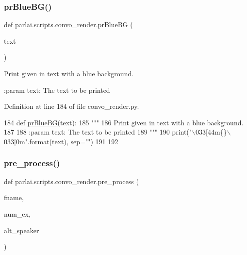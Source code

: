\subsubsection{\texorpdfstring{pr\+Blue\+B\+G()}{prBlueBG()}}
{\footnotesize\ttfamily def parlai.\+scripts.\+convo\+\_\+render.\+pr\+Blue\+BG (\begin{DoxyParamCaption}\item[{}]{text }\end{DoxyParamCaption})}

\begin{DoxyVerb}Print given in text with a blue background.

:param text: The text to be printed
\end{DoxyVerb}
 

Definition at line 184 of file convo\+\_\+render.\+py.


\begin{DoxyCode}
184 \textcolor{keyword}{def }\hyperlink{namespaceparlai_1_1scripts_1_1convo__render_a21a7681b9803eb6994ac72c7d480cb94}{prBlueBG}(text):
185     \textcolor{stringliteral}{"""}
186 \textcolor{stringliteral}{    Print given in text with a blue background.}
187 \textcolor{stringliteral}{}
188 \textcolor{stringliteral}{    :param text: The text to be printed}
189 \textcolor{stringliteral}{    """}
190     print(\textcolor{stringliteral}{"\(\backslash\)033[44m\{\}\(\backslash\)033[0m"}.\hyperlink{namespaceparlai_1_1chat__service_1_1services_1_1messenger_1_1shared__utils_a32e2e2022b824fbaf80c747160b52a76}{format}(text), sep=\textcolor{stringliteral}{""})
191 
192 
\end{DoxyCode}
\mbox{\label{namespaceparlai_1_1scripts_1_1convo__render_a0f0a031443ca797c936d2961a702a45e}} 
\subsubsection{\texorpdfstring{pre\+\_\+process()}{pre\_process()}}
{\footnotesize\ttfamily def parlai.\+scripts.\+convo\+\_\+render.\+pre\+\_\+process (\begin{DoxyParamCaption}\item[{}]{fname,  }\item[{}]{num\+\_\+ex,  }\item[{}]{alt\+\_\+speaker }\end{DoxyParamCaption})}


